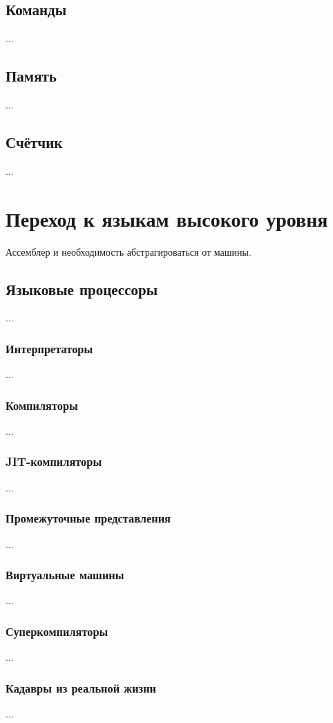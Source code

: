 \documentclass[11pt]{book}
\begin{document}
\section{Команды}
...
\section{Память}
...
\section{Счётчик}
...
\chapter{Переход к языкам высокого уровня}
Ассемблер и необходимость абстрагироваться от машины.

\section{Языковые процессоры}
...
\subsection{Интерпретаторы}
...
\subsection{Компиляторы}
...
\subsection{JIT-компиляторы}
...
\subsection{Промежуточные представления}
...
\subsection{Виртуальные машины}
...
\subsection{Суперкомпиляторы}
...
\subsection{Кадавры из реальной жизни}
...
\end{document}
